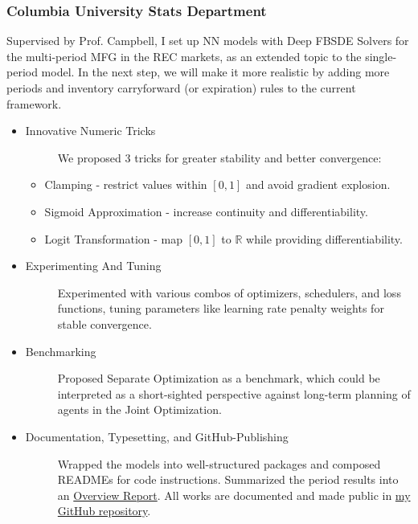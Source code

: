 \documentclass[a4paper]{article}
\newcommand{\MFG}{\href{https://github.com/OrangeAoo/Multi-Period-Compliance-MFG-FBSDEs}{my GitHub repository}}
\begin{document}
\subsubsection{Columbia University Stats Department}
\vspace{3pt}
    Supervised by Prof. Campbell, I set up NN models with Deep FBSDE Solvers for the multi-period MFG in the REC markets, as an extended topic to the single-period model. In the next step, we will make it more realistic by adding more periods and inventory carryforward (or expiration) rules to the current framework.
\begin{itemize}
    \item\begin{description}
        \item[Innovative Numeric Tricks] We proposed 3 tricks for greater stability and better convergence:
    \end{description}
    \begin{itemize}
        \item Clamping - restrict values within $[0,1]$ and avoid gradient explosion.
        \item Sigmoid Approximation - increase continuity and differentiability.
        \item Logit Transformation - map $[0,1]$ to $\mathbb{R}$ while providing differentiability.
    \end{itemize}
    \item\begin{description}
        \item[Experimenting And Tuning] Experimented with various combos of optimizers, schedulers, and loss functions, tuning parameters like learning rate penalty weights for stable convergence. 
    \end{description}
    \item \begin{description}
        \item[Benchmarking] Proposed Separate Optimization as a benchmark, which could be interpreted as a short-sighted perspective against long-term planning of agents in the Joint Optimization.
    \end{description}
    \item \begin{description}
        \item[Documentation, Typesetting, and GitHub-Publishing] Wrapped the models into well-structured packages and composed READMEs for code instructions. Summarized the period results into an \href{https://github.com/OrangeAoo/Multi-Compliance-MFG-FBSDEs/blob/FBSDE/FinalReports/ReportOverview-MFG-FBSDE.pdf}{Overview Report}. All works are documented and made public in \MFG.  
    \end{description}
\end{itemize}
\end{document}
